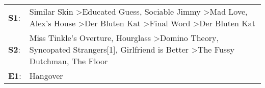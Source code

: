 \begin{supertabular}{p{0.03\textwidth}p{0.92\textwidth}}
 \textbf{S1}:  &  Similar Skin\textsuperscript{} \textgreater \enspace Educated Guess\textsuperscript{}, \enspace Sociable Jimmy\textsuperscript{} \textgreater \enspace Mad Love\textsuperscript{}, \enspace Alex's House\textsuperscript{} \textgreater \enspace Der Bluten Kat\textsuperscript{} \textgreater \enspace Final Word\textsuperscript{} \textgreater \enspace Der Bluten Kat\textsuperscript{}  \enspace  \\
 \textbf{S2}:  &                                                   Miss Tinkle's Overture\textsuperscript{}, \enspace Hourglass\textsuperscript{} \textgreater \enspace Domino Theory\textsuperscript{}, \enspace Syncopated Strangers[1]\textsuperscript{}, \enspace Girlfriend is Better\textsuperscript{} \textgreater \enspace The Fussy Dutchman\textsuperscript{}, \enspace The Floor\textsuperscript{}  \enspace  \\
 \textbf{E1}:  &                                                                                                                                                                                                                                                                                                                                                                   Hangover\textsuperscript{}  \enspace  \\
\end{supertabular}
